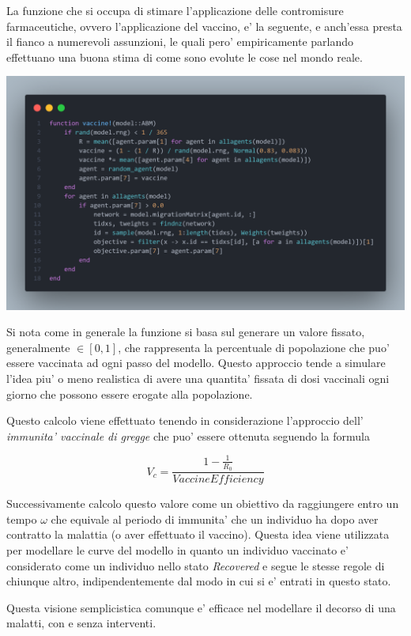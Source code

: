 La funzione che si occupa di stimare l'applicazione delle contromisure farmaceutiche, ovvero l'applicazione del vaccino,
e' la seguente, e anch'essa presta il fianco a numerevoli assunzioni, le quali pero' empiricamente parlando
effettuano una buona stima di come sono evolute le cose nel mondo reale.

\begin{minipage}{\linewidth}
	\centering
	\includegraphics[width=\textwidth]{img/vaccine.png}
	\label{fig:vaccine}
\end{minipage}

Si nota come in generale la funzione si basa sul generare un valore fissato, generalmente $\in [0,1]$, che 
rappresenta la percentuale di popolazione che puo' essere vaccinata ad ogni passo del modello.
Questo approccio tende a simulare l'idea piu' o meno realistica di avere una quantita' fissata di 
dosi vaccinali ogni giorno che possono essere erogate alla popolazione. 

Questo calcolo viene effettuato tenendo in considerazione l'approccio dell' \emph{immunita' vaccinale di gregge} che puo'
essere ottenuta seguendo la formula 

$$V_c = \frac{1-\frac{1}{R_0}}{VaccineEfficiency}$$

Successivamente calcolo questo valore come un obiettivo da raggiungere entro un tempo $\omega$ che equivale al 
periodo di immunita' che un individuo ha dopo aver contratto la malattia (o aver effettuato il vaccino). 
Questa idea viene utilizzata per modellare le curve del modello in quanto un individuo vaccinato e' considerato 
come un individuo nello stato \emph{Recovered} e segue le stesse regole di chiunque altro, indipendentemente
dal modo in cui si e' entrati in questo stato. 

Questa visione semplicistica comunque e' efficace nel modellare il decorso di una malatti, con e senza interventi.
